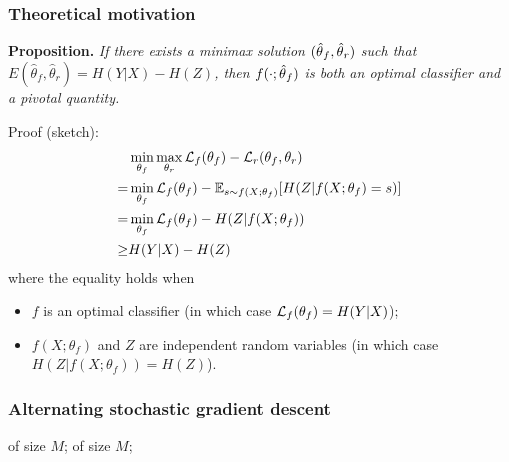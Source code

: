 \documentclass{beamer}
\begin{document}
\begin{frame}
    \frametitle{Theoretical motivation}

    {\bf Proposition.}
    {\it If there exists a minimax solution $(\smash{\hat\theta}_f, \smash{\hat\theta}_r)$
    such that
    $E(\hat\theta_f, \hat\theta_r) = H({Y|X}) - H(Z)$, then
    $f(\cdot;\smash{\hat\theta}_f)$ is both an optimal classifier and a pivotal
    quantity.}

    \vspace{0.5cm}

    Proof (sketch):
    {\scriptsize
    \begin{align*}
         & \min_{\theta_f} \max_{\theta_r} {\cal L}_f(\theta_f) - {\cal L}_r(\theta_f, \theta_r) \\
         =& \min_{\theta_f} {\cal L}_f(\theta_f) - \mathbb{E}_{s \sim f(X;\theta_f)} [H(Z|f(X;\theta_f) = s)] \\
         =& \min_{\theta_f} {\cal L}_f(\theta_f) - H(Z|f(X;\theta_f)) \\
         \geq& H({Y|X}) - H(Z)
    \end{align*}}
    where the equality holds when
    \begin{itemize}
        \item  $f$ is an optimal classifier (in which case ${\cal L}_f(\theta_f) = H({Y|X})$);
        \item  $f(X;\theta_f)$ and $Z$ are independent random variables (in which case $H(Z|f(X;\theta_f)) = H(Z)$).
    \end{itemize}
\end{frame}


\begin{frame}[fragile]
    \frametitle{Alternating stochastic gradient descent}
        \begin{minipage}{\linewidth}
            \scriptsize

        \begin{algorithmic}[1]
                 
                     of size $M$;
                \EndFor
                 of size $M$; 
            \EndFor
        \end{algorithmic}

        \end{minipage}
\end{frame}
\end{document}
